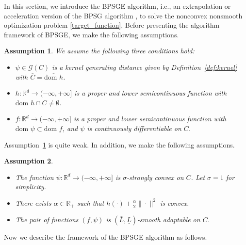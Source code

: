 \documentclass[letterpaper]{article} %
\newtheorem{assumption}{Assumption}
\begin{document}
	In this section, we introduce the BPSGE algorithm, i.e., an extrapolation or acceleration version of the BPSG algorithm \cite{WangH23},   to solve the nonconvex nonsmooth optimization problem \eqref{target_function}.
	Before presenting the algorithm framework of BPSGE, we make the following assumptions.
	\begin{assumption} \label{assume_01}
		We assume   the following three conditions hold:
		\begin{itemize}
			\item $\psi\in\mathcal{G}(C)$ is a kernel generating distance given by Definition~\ref{def:kernel} with $\overline{C}=\overline{\text{dom }h}$.
			\item $h:\mathbb{R}^{d}\rightarrow(-\infty,+\infty]$ is a proper and lower semicontinuous function with $\text{dom }h\cap C\neq\emptyset$.
			\item $f:\mathbb{R}^{d}\rightarrow(-\infty,+\infty]$ is a proper and lower semicontinuous function with $\text{dom }\psi\subset\text{dom }f$, and  $\psi$ is continuously differentiable on $C$.
		\end{itemize}
	\end{assumption}
	Assumption~\ref{assume_01} is quite weak. In addition, we make the following assumptions.
	\begin{assumption}\label{assume_02}
		\begin{itemize}
			\item The function $\psi:\mathbb{R}^{d}\rightarrow(-\infty,+\infty]$ is $\sigma$-strongly convex on $C$. Let $\sigma=1$ for simplicity.
			\item There exists $\alpha\in\mathbb{R}_{+}$ such that $h(\cdot)+\frac{\alpha}{2}\|\cdot\|^{2}$ is convex.
			\item The pair of functions $(f,\psi)$ is $(\bar{L},\underline{L})$-smooth adaptable on $C$.
		\end{itemize}
	\end{assumption}

	Now we describe the framework of the BPSGE algorithm as follows.
\end{document}
